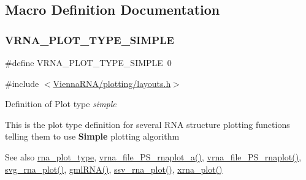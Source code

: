 \subsection{Macro Definition Documentation}
\mbox{\label{group__plotting__utils_gae6d17b9f0a53cf5205a9181e0f8422e9}} 
\subsubsection{\texorpdfstring{V\+R\+N\+A\+\_\+\+P\+L\+O\+T\+\_\+\+T\+Y\+P\+E\+\_\+\+S\+I\+M\+P\+LE}{VRNA\_PLOT\_TYPE\_SIMPLE}}
{\footnotesize\ttfamily \#define V\+R\+N\+A\+\_\+\+P\+L\+O\+T\+\_\+\+T\+Y\+P\+E\+\_\+\+S\+I\+M\+P\+LE~0}



{\ttfamily \#include $<$\hyperlink{layouts_8h}{Vienna\+R\+N\+A/plotting/layouts.\+h}$>$}



Definition of Plot type {\itshape simple} 

This is the plot type definition for several R\+NA structure plotting functions telling them to use {\bfseries Simple} plotting algorithm

\begin{DoxySeeAlso}{See also}
\hyperlink{group__plotting__utils_ga5964c4581431b098b80027d6e14dcdd4}{rna\+\_\+plot\+\_\+type}, \hyperlink{group__plotting__utils_ga139a31dd0ba9fc6612431f67de901c31}{vrna\+\_\+file\+\_\+\+P\+S\+\_\+rnaplot\+\_\+a()}, \hyperlink{group__plotting__utils_gabdc8f6548ba4a3bc3cd868ccbcfdb86a}{vrna\+\_\+file\+\_\+\+P\+S\+\_\+rnaplot()}, \hyperlink{group__plotting__utils_gae7853539b5df98f294b4af434e979304}{svg\+\_\+rna\+\_\+plot()}, \hyperlink{group__plotting__utils_ga70834bc8c0aad4fe6824ff76ccb8f329}{gml\+R\+N\+A()}, \hyperlink{group__plotting__utils_gadd368528755f9a830727b680243541df}{ssv\+\_\+rna\+\_\+plot()}, \hyperlink{group__plotting__utils_ga2f6d5953e6a323df898896b8d6614483}{xrna\+\_\+plot()} 
\end{DoxySeeAlso}
\mbox{\label{group__plotting__utils_ga94d4c863ecac2f220f76658afb92f964}} 
